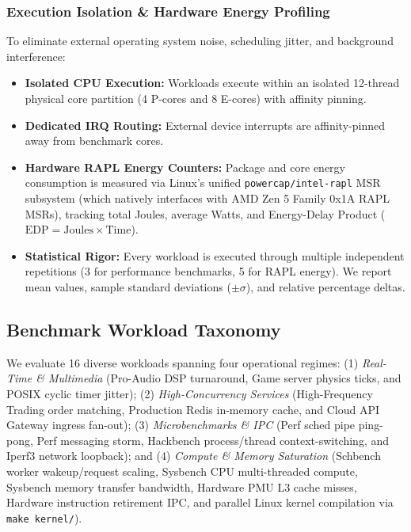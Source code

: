 \documentclass[conference]{IEEEtran}
\begin{document}
\subsubsection{Execution Isolation \& Hardware Energy Profiling}
To eliminate external operating system noise, scheduling jitter, and background interference:
\begin{itemize}\setlength{\itemsep}{1pt}\setlength{\parskip}{0pt}
    \item \textbf{Isolated CPU Execution:} Workloads execute within an isolated 12-thread physical core partition (4 P-cores and 8 E-cores) with affinity pinning.
    \item \textbf{Dedicated IRQ Routing:} External device interrupts are affinity-pinned away from benchmark cores.
    \item \textbf{Hardware RAPL Energy Counters:} Package and core energy consumption is measured via Linux's unified \texttt{powercap/intel-rapl} MSR subsystem (which natively interfaces with AMD Zen 5 Family 0x1A RAPL MSRs), tracking total Joules, average Watts, and Energy-Delay Product ($\mathrm{EDP} = \mathrm{Joules} \times \mathrm{Time}$).
    \item \textbf{Statistical Rigor:} Every workload is executed through multiple independent repetitions (3 for performance benchmarks, 5 for RAPL energy). We report mean values, sample standard deviations ($\pm \sigma$), and relative percentage deltas.
\end{itemize}

\subsection{Benchmark Workload Taxonomy}
We evaluate 16 diverse workloads spanning four operational regimes: (1) \emph{Real-Time \& Multimedia} (Pro-Audio DSP turnaround, Game server physics ticks, and POSIX cyclic timer jitter); (2) \emph{High-Concurrency Services} (High-Frequency Trading order matching, Production Redis in-memory cache, and Cloud API Gateway ingress fan-out); (3) \emph{Microbenchmarks \& IPC} (Perf sched pipe ping-pong, Perf messaging storm, Hackbench process/thread context-switching, and Iperf3 network loopback); and (4) \emph{Compute \& Memory Saturation} (Schbench worker wakeup/request scaling, Sysbench CPU multi-threaded compute, Sysbench memory transfer bandwidth, Hardware PMU L3 cache misses, Hardware instruction retirement IPC, and parallel Linux kernel compilation via \texttt{make kernel/}).
\end{document}

